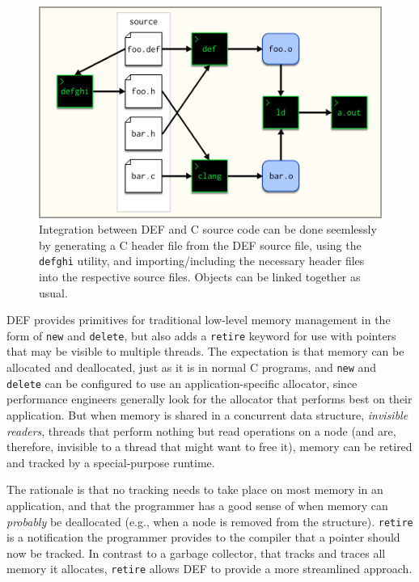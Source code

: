 \begin{figure}[htbp!]
        \centering
        \includegraphics[scale=0.25]{gfx/seemless-integration}
        \caption{Integration between DEF and C source code can be done seemlessly by generating a C header file from the DEF source file, using the \texttt{defghi} utility, and importing/including the necessary header files into the respective source files.  Objects can be linked together as usual.}
        \label{fig:seemless-integration}
\end{figure}

DEF provides primitives for traditional low-level memory management in the form of \texttt{new} and \texttt{delete}, but also adds a \texttt{retire} keyword for use with pointers that may be visible to multiple threads.  The expectation is that memory can be allocated and deallocated, just as it is in normal C programs, and \texttt{new} and \texttt{delete} can be configured to use an application-specific allocator, since performance engineers generally look for the allocator that performs best on their application.  But when memory is shared in a concurrent data structure, \textit{invisible readers}, threads that perform nothing but read operations on a node (and are, therefore, invisible to a thread that might want to free it), memory can be retired and tracked by a special-purpose runtime.

The rationale is that no tracking needs to take place on most memory in an application, and that the programmer has a good sense of when memory can \textit{probably} be deallocated (e.g., when a node is removed from the structure).  \texttt{retire} is a notification the programmer provides to the compiler that a pointer should now be tracked.  In contrast to a garbage collector, that tracks and traces all memory it allocates, \texttt{retire} allows DEF to provide a more streamlined approach.

